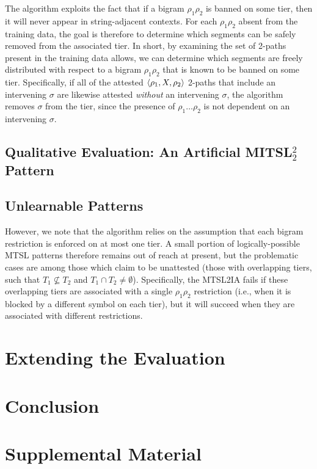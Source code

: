 \documentclass[11pt,a4paper]{article}
\begin{document}
 The algorithm exploits the fact that if a bigram $\rho_1\rho_2$ is banned on some tier, then it will never appear in string-adjacent contexts. For each $\rho_1\rho_2$ absent from the training data, the goal is therefore to determine which segments can be safely removed from the associated tier. 
  In short, by examining the set of 2-paths present in the training data allows, we can determine which segments are freely distributed with respect to a bigram $\rho_1\rho_2$ that is known to be banned on some tier. Specifically, if all of the attested $\langle{\rho_1, X, \rho_2}\rangle$ 2-paths that include an intervening $\sigma$ are likewise attested \emph{without} an intervening $\sigma$, the algorithm removes $\sigma$ from the tier, since the presence of $\rho_1\ldots{}\rho_2$ is not dependent on an intervening $\sigma$.

\subsection{Qualitative Evaluation: An Artificial MITSL$^2_2$ Pattern}

\subsection{Unlearnable Patterns}

 However, we note that the algorithm relies on the assumption that each bigram restriction is enforced on at most one tier. A small portion of logically-possible MTSL patterns therefore remains out of reach at present, but the problematic cases are among those which \citet{AksenovaDeshmukh2018} claim to be unattested (those with overlapping tiers, such that $T_1\not\subseteq T_2$ and $T_1\cap T_2\neq\emptyset$). Specifically, the MTSL2IA fails if these overlapping tiers are associated with a single \text{*}$\rho_1\rho_2$ restriction (i.e., when it is blocked by a different symbol on each tier), but it will succeed when they are associated with different restrictions.

\section{Extending the Evaluation}

\section{Conclusion}





\appendix

\section{Supplemental Material}
\label{sec:supplemental}
\end{document}

